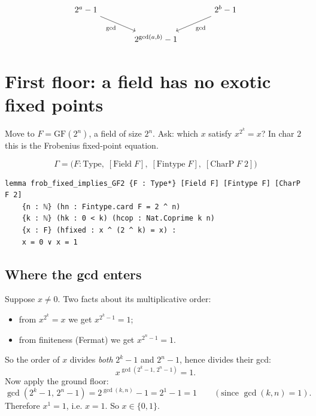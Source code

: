 \documentclass[11pt]{article}
\begin{document}
\[
\begin{tikzcd}[column sep=large]
2^a-1 \arrow[dr, "\gcd"'] & & 2^b-1 \arrow[dl, "\gcd"] \\
& 2^{\gcd(a,b)}-1 &
\end{tikzcd}
\]


\bigskip

\section{First floor: a field has no exotic fixed points}

\noindent
Move to $F=\mathrm{GF}(2^n)$, a field of size $2^n$. Ask: which $x$ satisfy
$x^{2^k}=x$? In char $2$ this is the Frobenius fixed-point equation.

\[
\Gamma=\bigl(F:\mathrm{Type},\;[\mathrm{Field}\;F],\;[\mathrm{Fintype}\;F],\;[\mathrm{CharP}\;F\;2]\bigr)
\]

\begin{lstlisting}
lemma frob_fixed_implies_GF2 {F : Type*} [Field F] [Fintype F] [CharP F 2]
    {n : ℕ} (hn : Fintype.card F = 2 ^ n)
    {k : ℕ} (hk : 0 < k) (hcop : Nat.Coprime k n)
    {x : F} (hfixed : x ^ (2 ^ k) = x) :
    x = 0 ∨ x = 1
\end{lstlisting}

\bigskip
\subsection*{Where the gcd enters}

\noindent
Suppose $x\neq 0$. Two facts about its multiplicative order:
\begin{itemize}\itemsep4pt
  \item from $x^{2^k}=x$ we get $x^{2^k-1}=1$;
  \item from finiteness (Fermat) we get $x^{2^n-1}=1$.
\end{itemize}
So the order of $x$ divides \emph{both} $2^k-1$ and $2^n-1$, hence divides their
gcd:
\[
x^{\gcd(2^k-1,\,2^n-1)} = 1 .
\]
Now apply the ground floor:
\[
\gcd(2^k-1,\,2^n-1)=2^{\gcd(k,n)}-1 = 2^{1}-1 = 1
\qquad(\text{since }\gcd(k,n)=1).
\]
Therefore $x^{1}=1$, i.e. $x=1$. So $x\in\{0,1\}$.
\end{document}
